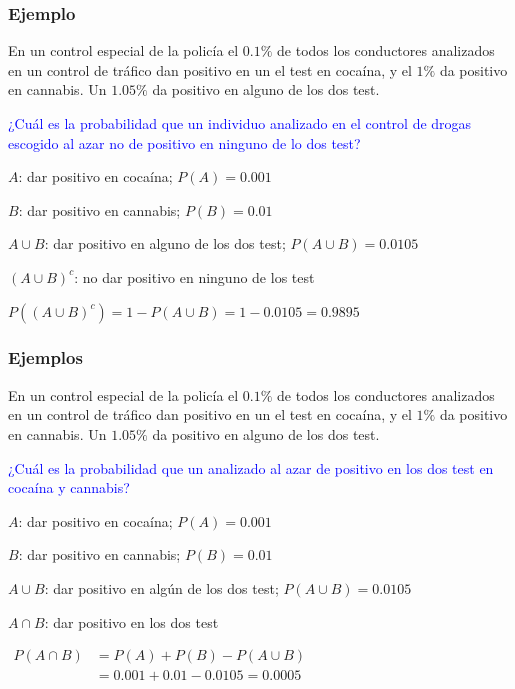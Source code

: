 \documentclass[handout]{beamer}\usepackage[]{graphicx}\usepackage[]{color}
\newcommand{\blue}[1]{\textcolor{blue}{#1}}
\theoremstyle{plain}
\theoremstyle{definition}
\begin{document}
\begin{frame}
\frametitle{Ejemplo}


En un control especial de la policía el $0.1\%$ de todos los conductores analizados en un control de tráfico dan  positivo en un el test  en cocaína, y  el $1\%$ da positivo  en cannabis. Un $1.05\%$ da positivo en alguno de los dos test. \medskip

\blue{¿Cuál  es la probabilidad que un individuo analizado  en el control de drogas  escogido  al azar no de positivo  en ninguno de lo dos test?}
\medskip

$A$: dar positivo  en cocaína; $P(A)=0.001$
\medskip

$B$: dar positivo en cannabis; $P(B)=0.01$
\medskip

$A\cup B$: dar positivo en alguno de los dos test; $P(A\cup B)=0.0105$
\medskip

$(A\cup B)^c$: no dar positivo en ninguno de los test
\bigskip

$P((A\cup B)^c)=1-P(A\cup B)=1-0.0105=0.9895$
\end{frame}



\begin{frame}
\frametitle{Ejemplos}

En un control especial de la policía el $0.1\%$ de todos los conductores analizados en un control de tráfico dan  positivo en un el test  en cocaína, y  el $1\%$ da positivo  en cannabis. Un $1.05\%$ da positivo en alguno de los dos test. \medskip


\blue{¿Cuál  es la probabilidad que un analizado  al azar de positivo en los dos test en cocaína y cannabis?}
\medskip

$A$: dar positivo en cocaína; $P(A)=0.001$
\medskip

$B$: dar positivo en cannabis; $P(B)=0.01$
\medskip

$A\cup B$: dar positivo en algún de los dos test; $P(A\cup B)=0.0105$
\pause\medskip

$A\cap B$: dar positivo en los dos test
\bigskip

$\begin{array}{rl}
{P(A\cap B)} &{=P(A)+P(B)-P(A\cup B)}\\ &{=0.001+0.01-0.0105=0.0005}
\end{array}$
\end{frame}
\end{document}

